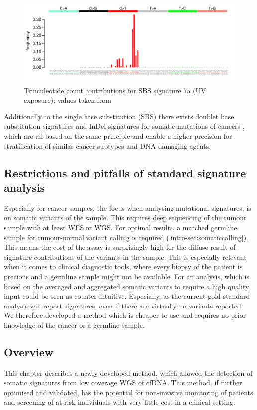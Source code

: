 \begin{figure}[!ht]
\centering
\includegraphics[width=.99\linewidth]{Figures/MisMatchFinder/SBS7aSignature.pdf}
\caption[Trinculeotide count contributions for single base substitution (SBS) signature 7a]{Trinculeotide count contributions for SBS signature 7a (UV exposure); values taken from \protect\textcite{Alexandrov2020}}\label{fig:sig7a}
\end{figure}

Additionally to the single base substitution (SBS) there exists doublet base substitution signatures and InDel signatures for somatic mutations of cancers \cite{Alexandrov2020}, which are all based on the same principle and enable a higher precision for stratification of similar cancer subtypes and DNA damaging agents.

\subsection{Restrictions and pitfalls of standard signature analysis}
Especially for cancer samples, the focus when analysing mutational signatures, is on somatic variants of the sample. This requires deep sequencing of the tumour sample with at least WES or WGS. For optimal results, a  matched germline sample for tumour-normal variant calling is required (\autoref{intro-sec:somaticcalling}). This means the cost of the assay is surprisingly high for the diffuse result of signature contributions of the variants in the sample. This is especially relevant when it comes to clinical diagnostic tools, where every biopsy of the patient is precious and a germline sample might not be available. For an analysis, which is based on the averaged and aggregated somatic variants to require a high quality input could be seen as counter-intuitive. Especially, as the current gold standard analysis will report signatures, even if there are virtually no variants reported. We therefore developed a method which is cheaper to use and requires no prior knowledge of the cancer or a germline sample.

\subsection{Overview}
 This chapter describes a newly developed method, which allowed the detection of somatic signatures from low coverage WGS of cfDNA. This method, if further optimised and validated, has the potential for non-invasive monitoring of patients and  screening of at-risk individuals with very little cost in a clinical setting.
